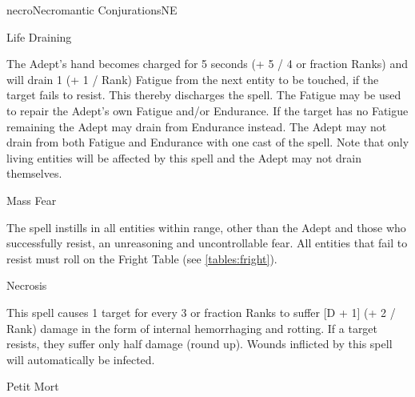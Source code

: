 \begin{college}[1.1]{necro}{Necromantic Conjurations}{NE}
\begin{spell}[S-7]{Life Draining}
\begin{effects}
The Adept's hand becomes charged for 5 seconds (+ 5 / 4 or fraction
Ranks) and will drain 1 (+ 1 / Rank) Fatigue from the next entity to
be touched, if the target fails to resist.  This thereby discharges
the spell.  The Fatigue may be used to repair the Adept's own Fatigue
and/or Endurance.  If the target has no Fatigue remaining the Adept
may drain from Endurance instead.  The Adept may not drain from both
Fatigue and Endurance with one cast of the spell.  Note that only
living entities will be affected by this spell and the Adept may not
drain themselves.
\end{effects}
\end{spell}

\begin{spell}[S-8]{Mass Fear}

\begin{effects}
The spell instills in all entities within range, other than the Adept
and those who successfully resist, an unreasoning and uncontrollable
fear.  All entities that fail to resist must roll on the Fright Table
(see \ref{tables:fright}).
\end{effects}
\end{spell}

\begin{spell}[S-9]{Necrosis}

\begin{effects}
This spell causes 1 target for every 3 or fraction Ranks to suffer [D
+ 1] (+ 2 / Rank) damage in the form of internal hemorrhaging and
rotting.  If a target resists, they suffer only half damage (round
up).  Wounds inflicted by this spell will automatically be infected.
\end{effects}
\end{spell}

\begin{spell}[S-10]{Petit Mort}


\end{spell}
\end{college}
